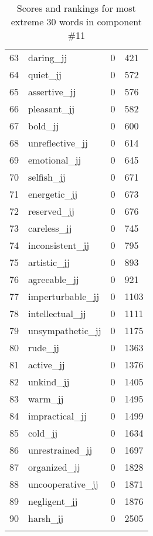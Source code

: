 \begin{longtable}[!htbp]{| rlr@{.}l |}
    63 & daring\_jj & 0 & 421 \\
    64 & quiet\_jj & 0 & 572 \\
    65 & assertive\_jj & 0 & 576 \\
    66 & pleasant\_jj & 0 & 582 \\
    67 & bold\_jj & 0 & 600 \\
    68 & unreflective\_jj & 0 & 614 \\
    69 & emotional\_jj & 0 & 645 \\
    70 & selfish\_jj & 0 & 671 \\
    71 & energetic\_jj & 0 & 673 \\
    72 & reserved\_jj & 0 & 676 \\
    73 & careless\_jj & 0 & 745 \\
    74 & inconsistent\_jj & 0 & 795 \\
    75 & artistic\_jj & 0 & 893 \\
    76 & agreeable\_jj & 0 & 921 \\
    77 & imperturbable\_jj & 0 & 1103 \\
    78 & intellectual\_jj & 0 & 1111 \\
    79 & unsympathetic\_jj & 0 & 1175 \\
    80 & rude\_jj & 0 & 1363 \\
    81 & active\_jj & 0 & 1376 \\
    82 & unkind\_jj & 0 & 1405 \\
    83 & warm\_jj & 0 & 1495 \\
    84 & impractical\_jj & 0 & 1499 \\
    85 & cold\_jj & 0 & 1634 \\
    86 & unrestrained\_jj & 0 & 1697 \\
    87 & organized\_jj & 0 & 1828 \\
    88 & uncooperative\_jj & 0 & 1871 \\
    89 & negligent\_jj & 0 & 1876 \\
    90 & harsh\_jj & 0 & 2505 \\
    \hline
    \caption{Scores and rankings for most extreme 30 words in component \#11} \\
\end{longtable}
